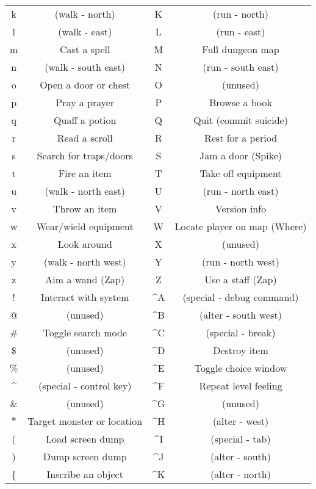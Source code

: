 \paragraph{}
\begin{tabular}{cc|cc}
k & (walk - north) & K & (run - north)\\
l & (walk - east) & L & (run - east)\\
m & Cast a spell & M & Full dungeon map\\
n & (walk - south east) & N & (run - south east)\\
o & Open a door or chest & O & (unused)\\
p & Pray a prayer & P & Browse a book\\
q & Quaff a potion & Q & Quit (commit suicide)\\
r & Read a scroll & R & Rest for a period\\
s & Search for traps/doors & S & Jam a door (Spike)\\
t & Fire an item & T & Take off equipment\\
u & (walk - north east) & U & (run - north east)\\
v & Throw an item & V & Version info\\
w & Wear/wield equipment & W & Locate player on map (Where)\\
x & Look around & X & (unused)\\
y & (walk - north west) & Y & (run - north west)\\
z & Aim a wand (Zap) & Z & Use a staff (Zap)\\
! & Interact with system & \^{}A & (special - debug command)\\
@ & (unused) & \^{}B & (alter - south west)\\
\# & Toggle search mode & \^{}C & (special - break)\\
\$ & (unused) & \^{}D & Destroy item\\
\% & (unused) & \^{}E & Toggle choice window\\
\^{} & (special - control key) & \^{}F & Repeat level feeling\\
\& & (unused) & \^{}G & (unused)\\
$\ast$ & Target monster or location & \^{}H & (alter - west)\\
( & Load screen dump & \^{}I & (special - tab)\\
) & Dump screen dump & \^{}J & (alter - south)\\
\{ & Inscribe an object & \^{}K & (alter - north)\\

\end{tabular}
